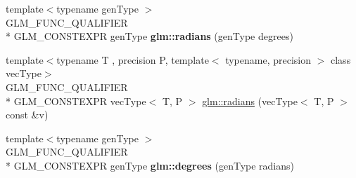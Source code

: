 \begin{DoxyCompactItemize}
\item 
\hypertarget{namespaceglm_a00577ee752441c79d5bb11d7c29e1627}{{\footnotesize template$<$typename gen\-Type $>$ }\\G\-L\-M\-\_\-\-F\-U\-N\-C\-\_\-\-Q\-U\-A\-L\-I\-F\-I\-E\-R \\*
G\-L\-M\-\_\-\-C\-O\-N\-S\-T\-E\-X\-P\-R gen\-Type {\bfseries glm\-::radians} (gen\-Type degrees)}\label{namespaceglm_a00577ee752441c79d5bb11d7c29e1627}

\item 
{\footnotesize template$<$typename T , precision P, template$<$ typename, precision $>$ class vec\-Type$>$ }\\G\-L\-M\-\_\-\-F\-U\-N\-C\-\_\-\-Q\-U\-A\-L\-I\-F\-I\-E\-R \\*
G\-L\-M\-\_\-\-C\-O\-N\-S\-T\-E\-X\-P\-R vec\-Type$<$ T, P $>$ \hyperlink{group__core__func__trigonometric_gafffb5e533f75318bdf4e0967d8a6c05c}{glm\-::radians} (vec\-Type$<$ T, P $>$ const \&v)
\item 
\hypertarget{namespaceglm_a8a6fe45ac1da0ac1023bab706a675413}{{\footnotesize template$<$typename gen\-Type $>$ }\\G\-L\-M\-\_\-\-F\-U\-N\-C\-\_\-\-Q\-U\-A\-L\-I\-F\-I\-E\-R \\*
G\-L\-M\-\_\-\-C\-O\-N\-S\-T\-E\-X\-P\-R gen\-Type {\bfseries glm\-::degrees} (gen\-Type radians)}\label{namespaceglm_a8a6fe45ac1da0ac1023bab706a675413}


\end{DoxyCompactItemize}
